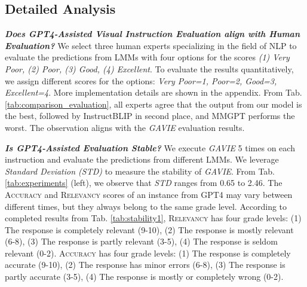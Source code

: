 \subsection{Detailed Analysis}
\textbf{\textit{Does GPT4-Assisted Visual Instruction Evaluation align with Human Evaluation?}} We select three human experts specializing in the field of NLP to evaluate the predictions from LMMs with four options for the scores \textit{(1) Very Poor, (2) Poor, (3) Good, (4) Excellent}. To evaluate the results quantitatively, we assign different scores for the options: \textit{Very Poor=1, Poor=2, Good=3, Excellent=4}. More implementation details are shown in the appendix. From Tab. \ref{tab:comparison_evaluation}, all experts agree that the output from our model is the best, followed by InstructBLIP in second place, and MMGPT performs the worst. The observation aligns with the \textit{GAVIE} evaluation results. 

\textbf{\textit{Is GPT4-Assisted Evaluation Stable?  }} We execute \textit{GAVIE} 5 times on each instruction and evaluate the predictions from different LMMs. We leverage \textit{Standard Deviation (STD)} to measure the stability of \textit{GAVIE}. From Tab. \ref{tab:experiments} (left), we observe that \textit{STD} ranges from 0.65 to 2.46. The \textsc{Accuracy} and \textsc{Relevancy} scores of an instance from GPT4 may vary between different times, but they always belong to the same grade level. According to completed results from Tab. \ref{tab:stability1}, \textsc{Relevancy} has four grade levels: (1) The response is completely relevant (9-10), (2) The response is mostly relevant (6-8), (3) The response is partly relevant (3-5), (4) The response is seldom relevant (0-2). \textsc{Accuracy} has four grade levels: (1) The response is completely accurate (9-10), (2) The response has minor errors (6-8), (3) The response is partly accurate (3-5), (4) The response is mostly or completely wrong (0-2).

